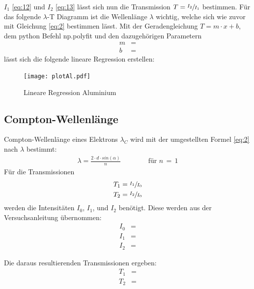     \justifying $I_1$ \eqref{eq:12} und $I_2$ \eqref{eq:13} lässt sich nun die Transmission $T=\sfrac{I_2}{I_1}$ bestimmen. Für das folgende $\lambda$-T Diagramm
    ist die Wellenlänge $\lambda$ wichtig, welche sich wie zuvor mit Gleichung \eqref{eq:2} bestimmen lässt. Mit der Geradengleichung $T = m \cdot x + b$, dem python Befehl np.polyfit 
    \cite{numpy} und den dazugehörigen Parametern
    \begin{align}
        m &= \text{} \label{eq:14}\\
        b &= \text{} \label{eq:15}
    \end{align}
    lässt sich die folgende lineare Regression erstellen:

    \begin{figure}[H]
        \centering
        \texttt{[image: plotAl.pdf]}
        \caption{Lineare Regression Aluminium}
        \label{fig:3}
    \end{figure}

    \subsection{Compton-Wellenlänge}

    \justifying Compton-Wellenlänge eines Elektrons $\lambda_C$ wird mit der umgestellten Formel \eqref{eq:2} nach $\lambda$ bestimmt:
    \begin{align}
        \lambda = \frac{2 \cdot d \cdot sin(\alpha)}{n} \qquad \qquad \text{für $n\,=\,1$} \label{eq:16}
    \end{align} 
    Für die Transmissionen
    \begin{align}
        T_1 &= \sfrac{I_1}{I_0} \\
        T_2 &= \sfrac{I_2}{I_0} 
    \end{align}
    werden die Intensitäten $I_0$, $I_1$, und $I_2$ benötigt. Diese werden aus der Versuchsanleitung \cite{V603} übernommen:
    \begin{subequations}\label{eq:17}
    \begin{align}
        I_0 &= \text{} \label{eq:17a}\\
        I_1 &= \text{} \label{eq:17b}\\
        I_2 &= \text{} \label{eq:17c}
    \end{align}
    \end{subequations}

    Die daraus resultierenden Transmissionen ergeben:
    \begin{align}
        T_1 &= \text{} \label{eq:18}\\
        T_2 &= \text{} \label{eq:19}
    \end{align}

